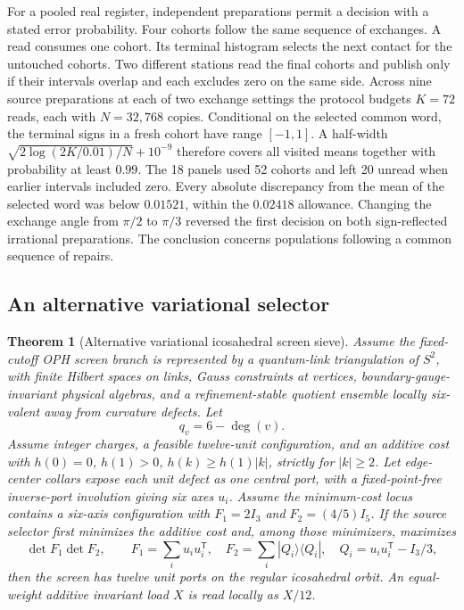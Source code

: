 \documentclass[11pt]{article}
\newtheorem{theorem}{Theorem}[section]
\theoremstyle{remark}
\theoremstyle{plain}
\begin{document}
For a pooled real register, independent preparations permit a decision
with a stated error probability. Four cohorts follow the same sequence
of exchanges. A read consumes one cohort. Its terminal histogram
selects the next contact for the untouched cohorts. Two different
stations read the final cohorts and publish only if their intervals
overlap and each excludes zero on the same side. Across nine source
preparations at each of two exchange settings the protocol budgets
$K=72$ reads, each with $N=32{,}768$ copies. Conditional on the selected
common word, the terminal signs in a fresh cohort have range
$[-1,1]$. A half-width $\sqrt{2\log(2K/0.01)/N}+10^{-9}$ therefore
covers all visited means together with probability at least $0.99$.
The 18 panels used 52 cohorts and left 20 unread when earlier intervals
included zero. Every absolute discrepancy from the mean of the selected
word was below $0.01521$, within the $0.02418$ allowance. Changing
the exchange angle from $\pi/2$ to $\pi/3$ reversed the first decision
on both sign-reflected irrational preparations. The conclusion concerns
populations following a common sequence of repairs.

\subsection{An alternative variational selector}

\begin{theorem}[Alternative variational icosahedral screen sieve]\label{thm:icosahedral-screen-sieve}
Assume the fixed-cutoff OPH screen branch is represented by a quantum-link
triangulation of \(S^2\), with finite Hilbert spaces on links, Gauss constraints
at vertices, boundary-gauge-invariant physical algebras, and a refinement-stable
quotient ensemble locally six-valent away from curvature defects. Let
\[
q_v=6-\deg(v).
\]
Assume integer charges, a feasible twelve-unit configuration, and an additive
cost with \(h(0)=0\), \(h(1)>0\), \(h(k)\ge h(1)|k|\), strictly for
\(|k|\ge2\). Let edge-center collars expose each unit defect as one central
port, with a fixed-point-free inverse-port involution giving six axes \(u_i\).
Assume the minimum-cost locus contains a six-axis configuration with
\(F_1=2I_3\) and \(F_2=(4/5)I_5\).  If the source selector first minimizes the
additive cost and, among those minimizers, maximizes
\[
 \det F_1\det F_2,\qquad
 F_1=\sum_i u_iu_i^{\mathsf T},\quad
 F_2=\sum_i|Q_i\rangle\langle Q_i|,\quad
 Q_i=u_iu_i^{\mathsf T}-I_3/3,
\]
then the screen has twelve unit ports on the regular icosahedral orbit. An
equal-weight additive invariant load \(X\) is read locally as \(X/12\).
\end{theorem}
\end{document}
